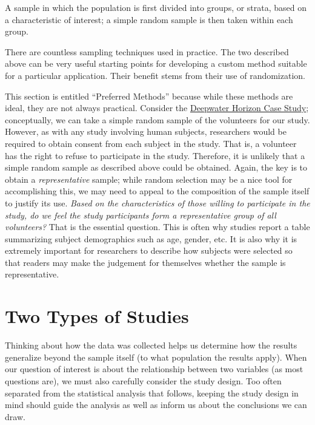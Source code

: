 \documentclass[]{book}
\theoremstyle{plain}
\theoremstyle{mydefn}
\theoremstyle{myexmpl}
\theoremstyle{remark}
\let\BeginKnitrBlock\begin \let\EndKnitrBlock\end
\let\BeginKnitrBlock\begin \let\EndKnitrBlock\end
\begin{document}
\BeginKnitrBlock{definition}[Stratified Random Sample]
\protect\hypertarget{def:defn-stratified-random-sample}{}{\label{def:defn-stratified-random-sample}
{} }A sample in which the
population is first divided into groups, or strata, based on a
characteristic of interest; a simple random sample is then taken within
each group.
\EndKnitrBlock{definition}

There are countless sampling techniques used in practice. The two
described above can be very useful starting points for developing a
custom method suitable for a particular application. Their benefit stems
from their use of randomization.

This section is entitled ``Preferred Methods'' because while these
methods are ideal, they are not always practical. Consider the
\protect\hyperlink{CaseDeepwater}{Deepwater Horizon Case Study};
conceptually, we can take a simple random sample of the volunteers for
our study. However, as with any study involving human subjects,
researchers would be required to obtain consent from each subject in the
study. That is, a volunteer has the right to refuse to participate in
the study. Therefore, it is unlikely that a simple random sample as
described above could be obtained. Again, the key is to obtain a
\emph{representative} sample; while random selection may be a nice tool
for accomplishing this, we may need to appeal to the composition of the
sample itself to justify its use. \emph{Based on the characteristics of
those willing to participate in the study, do we feel the study
participants form a representative group of all volunteers?} That is the
essential question. This is often why studies report a table summarizing
subject demographics such as age, gender, etc. It is also why it is
extremely important for researchers to describe how subjects were
selected so that readers may make the judgement for themselves whether
the sample is representative.

\section{Two Types of Studies}\label{two-types-of-studies}

Thinking about how the data was collected helps us determine how the
results generalize beyond the sample itself (to what population the
results apply). When our question of interest is about the relationship
between two variables (as most questions are), we must also carefully
consider the study design. Too often separated from the statistical
analysis that follows, keeping the study design in mind should guide the
analysis as well as inform us about the conclusions we can draw.
\end{document}
